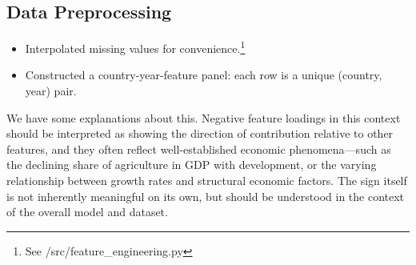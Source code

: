 \documentclass[12pt]{article}
\begin{document}
\begin{table}[H]
    \centering
    \small
    \caption{Indicator Table}
    \label{tab:indicator_table}
\end{table}



\subsection{Data Preprocessing}

\begin{itemize}
    \item Interpolated missing values for convenience.\footnote{See /src/feature\_engineering.py}
    \item Constructed a country-year-feature panel: each row is a unique (country, year) pair.
\end{itemize}
We have some explanations about this. Negative feature loadings in this context should be interpreted as showing the direction of contribution relative to other features, and they often reflect well-established economic phenomena—such as the declining share of agriculture in GDP with development, or the varying relationship between growth rates and structural economic factors.
The sign itself is not inherently meaningful on its own, but should be understood in the context of the overall model and dataset.
\end{document}
